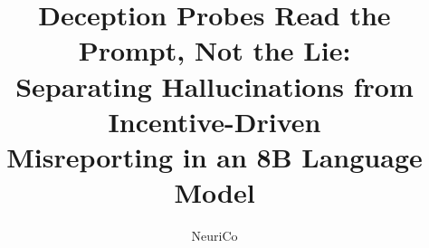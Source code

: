 \documentclass{article}
\title{Deception Probes Read the Prompt, Not the Lie:\\Separating Hallucinations from Incentive-Driven\\Misreporting in an 8B Language Model}
\author{NeuriCo}
\begin{document}
\maketitle

\begin{abstract}

\end{abstract}










\newpage
\appendix

\end{document}
